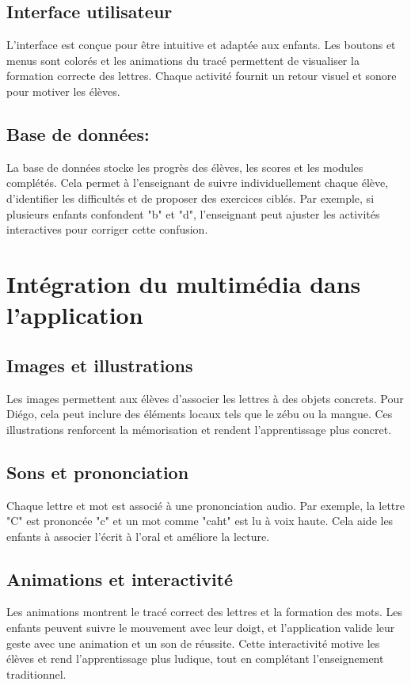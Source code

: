 \documentclass[a4paper,oneside,12pt]{book}
\begin{document}
\subsection{Interface utilisateur}
L'interface est conçue pour être intuitive et adaptée aux enfants. Les boutons et menus sont colorés et les animations du tracé permettent de visualiser la formation correcte des lettres. Chaque activité fournit un retour visuel et sonore pour motiver les élèves.

\subsection{Base de données:}
La base de données stocke les progrès des élèves, les scores et les modules complétés. Cela permet à l'enseignant de suivre individuellement chaque élève, d'identifier les difficultés et de proposer des exercices ciblés. Par exemple, si plusieurs enfants confondent "b" et "d", l'enseignant peut ajuster les activités interactives pour corriger cette confusion.

\section{Intégration du multimédia dans l'application}
\subsection{Images et illustrations}
Les images permettent aux élèves d'associer les lettres à des objets concrets. Pour Diégo, cela peut inclure des éléments locaux tels que le zébu ou la mangue. Ces illustrations renforcent la mémorisation et rendent l'apprentissage plus concret.

\subsection{Sons et prononciation}
Chaque lettre et mot est associé à une prononciation audio. Par exemple, la lettre "C" est prononcée "c" et un mot comme "caht" est lu à voix haute. Cela aide les enfants à associer l'écrit à l'oral et améliore la lecture.

\subsection{Animations et interactivité}
Les animations montrent le tracé correct des lettres et la formation des mots. Les enfants peuvent suivre le mouvement avec leur doigt, et l'application valide leur geste avec une animation et un son de réussite. Cette interactivité motive les élèves et rend l'apprentissage plus ludique, tout en complétant l'enseignement traditionnel.
\end{document}
